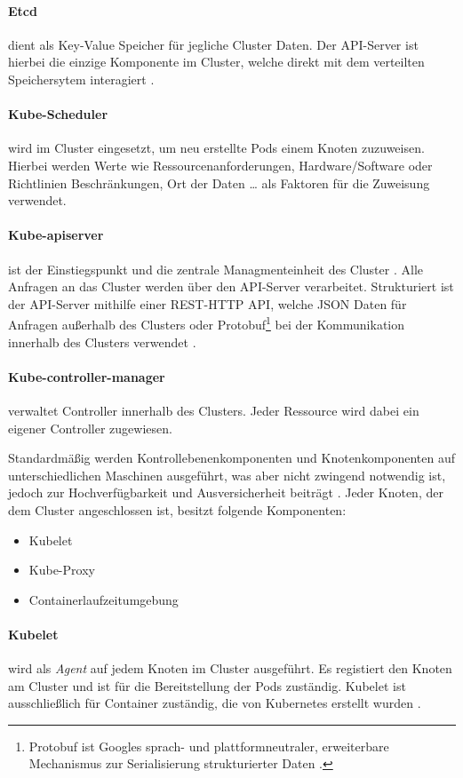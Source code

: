 \paragraph{Etcd} dient als Key-Value Speicher für jegliche Cluster Daten.
Der API-Server ist hierbei die einzige Komponente im Cluster, welche direkt mit dem verteilten Speichersytem interagiert \cite{Hausenblas2019}.
\paragraph{Kube-Scheduler} wird im Cluster eingesetzt, um neu erstellte Pods einem Knoten zuzuweisen.
Hierbei werden Werte wie Ressourcenanforderungen, Hardware/Software oder Richtlinien Beschränkungen, Ort der Daten \dots
als Faktoren für die Zuweisung verwendet.
\paragraph{Kube-apiserver} ist der Einstiegspunkt und die zentrale Managmenteinheit des Cluster \cite{Hausenblas2019}. 
Alle Anfragen an das Cluster werden über den API-Server verarbeitet.
Strukturiert ist der API-Server mithilfe einer REST-HTTP API, welche JSON Daten für Anfragen außerhalb des Clusters
oder Protobuf\footnote{Protobuf ist Googles sprach- und plattformneutraler, erweiterbare Mechanismus zur Serialisierung strukturierter Daten \cite{protobuf}.}
bei der Kommunikation innerhalb des Clusters verwendet \cite{Hausenblas2019}.
\paragraph{Kube-controller-manager} verwaltet Controller innerhalb des Clusters.
Jeder Ressource wird dabei ein eigener Controller zugewiesen.

Standardmäßig werden Kontrollebenenkomponenten und Knotenkomponenten auf unterschiedlichen Maschinen ausgeführt,
was aber nicht zwingend notwendig ist, jedoch zur Hochverfügbarkeit und Ausversicherheit beiträgt \cite{kubernetesComponents}. 
Jeder Knoten, der dem Cluster angeschlossen ist, besitzt folgende Komponenten:
\begin{itemize}
  \item Kubelet
  \item Kube-Proxy
  \item Containerlaufzeitumgebung
\end{itemize}

\paragraph{Kubelet} wird als \emph{Agent} auf jedem Knoten im Cluster ausgeführt. 
Es registiert den Knoten am Cluster und ist für die Bereitstellung der Pods zuständig.
Kubelet ist ausschließlich für Container zuständig, die von Kubernetes erstellt wurden \cite{kubernetesComponents}.
